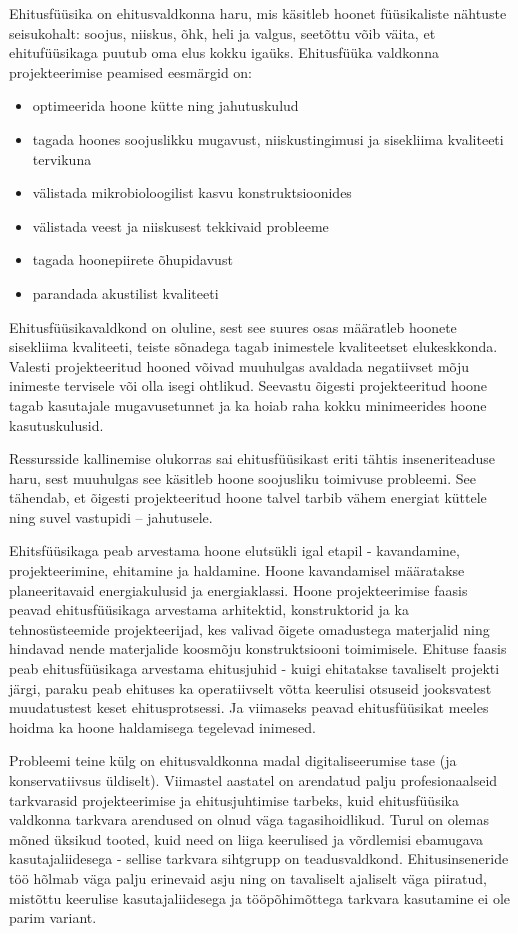 Ehitusfüüsika on ehitusvaldkonna haru, mis käsitleb hoonet füüsikaliste nähtuste seisukohalt: soojus, niiskus, õhk, heli ja valgus,
seetõttu võib väita, et ehitufüüsikaga puutub oma elus kokku igaüks.
Ehitusfüüka valdkonna projekteerimise peamised eesmärgid on:
\begin{itemize}
    \item optimeerida hoone kütte ning jahutuskulud
    \item tagada hoones soojuslikku mugavust, niiskustingimusi ja sisekliima kvaliteeti tervikuna
    \item välistada mikrobioloogilist kasvu konstruktsioonides
    \item välistada veest ja niiskusest tekkivaid probleeme
    \item tagada hoonepiirete õhupidavust
    \item parandada akustilist kvaliteeti
\end{itemize}

Ehitusfüüsikavaldkond on oluline, sest see suures osas määratleb hoonete sisekliima kvaliteeti, teiste sõnadega tagab inimestele kvaliteetset 
elukeskkonda. Valesti projekteeritud hooned võivad muuhulgas avaldada negatiivset mõju inimeste tervisele või olla isegi ohtlikud. 
Seevastu õigesti projekteeritud hoone tagab kasutajale mugavusetunnet ja ka hoiab raha kokku minimeerides hoone kasutuskulusid.

Ressursside kallinemise olukorras sai ehitusfüüsikast eriti tähtis inseneriteaduse haru, sest muuhulgas see käsitleb hoone soojusliku 
toimivuse probleemi. See tähendab, et õigesti projekteeritud hoone talvel tarbib vähem energiat küttele ning suvel vastupidi -- jahutusele.

Ehitsfüüsikaga peab arvestama hoone elutsükli igal etapil - kavandamine, projekteerimine, ehitamine ja haldamine. Hoone kavandamisel 
määratakse planeeritavaid energiakulusid ja energiaklassi. Hoone projekteerimise faasis peavad ehitusfüüsikaga arvestama arhitektid, 
konstruktorid ja ka tehnosüsteemide projekteerijad, kes valivad õigete omadustega materjalid ning hindavad nende materjalide koosmõju 
konstruktsiooni toimimisele. Ehituse faasis peab ehitusfüüsikaga arvestama ehitusjuhid - kuigi ehitatakse tavaliselt projekti järgi, 
paraku peab ehituses ka operatiivselt võtta keerulisi otsuseid jooksvatest muudatustest keset ehitusprotsessi. Ja viimaseks peavad 
ehitusfüüsikat meeles hoidma ka hoone haldamisega tegelevad inimesed.

Probleemi teine külg on ehitusvaldkonna madal digitaliseerumise tase (ja konservatiivsus üldiselt). Viimastel aastatel on 
arendatud palju profesionaalseid tarkvarasid projekteerimise ja ehitusjuhtimise tarbeks, kuid ehitusfüüsika valdkonna 
tarkvara arendused on olnud väga tagasihoidlikud. Turul on olemas mõned üksikud tooted, kuid need on liiga keerulised ja võrdlemisi 
ebamugava kasutajaliidesega - sellise tarkvara sihtgrupp on teadusvaldkond. Ehitusinseneride töö hõlmab väga palju erinevaid asju 
ning on tavaliselt ajaliselt väga piiratud, mistõttu keerulise kasutajaliidesega ja tööpõhimõttega tarkvara kasutamine ei ole parim variant. 

